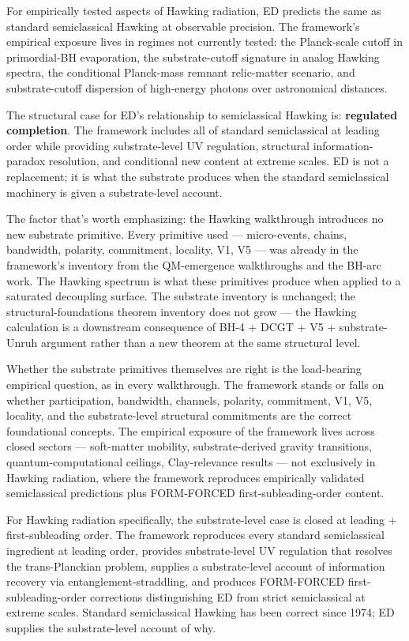 \documentclass[11pt,a4paper]{article}
\begin{document}
For empirically tested aspects of Hawking radiation, ED predicts the same as standard semiclassical Hawking at observable precision. The framework's empirical exposure lives in regimes not currently tested: the Planck-scale cutoff in primordial-BH evaporation, the substrate-cutoff signature in analog Hawking spectra, the conditional Planck-mass remnant relic-matter scenario, and substrate-cutoff dispersion of high-energy photons over astronomical distances.

The structural case for ED's relationship to semiclassical Hawking is: \textbf{regulated completion}. The framework includes all of standard semiclassical at leading order while providing substrate-level UV regulation, structural information-paradox resolution, and conditional new content at extreme scales. ED is not a replacement; it is what the substrate produces when the standard semiclassical machinery is given a substrate-level account.

The factor that's worth emphasizing: the Hawking walkthrough introduces no new substrate primitive. Every primitive used --- micro-events, chains, bandwidth, polarity, commitment, locality, V1, V5 --- was already in the framework's inventory from the QM-emergence walkthroughs and the BH-arc work. The Hawking spectrum is what these primitives produce when applied to a saturated decoupling surface. The substrate inventory is unchanged; the structural-foundations theorem inventory does not grow --- the Hawking calculation is a downstream consequence of BH-4 + DCGT + V5 + substrate-Unruh argument rather than a new theorem at the same structural level.

Whether the substrate primitives themselves are right is the load-bearing empirical question, as in every walkthrough. The framework stands or falls on whether participation, bandwidth, channels, polarity, commitment, V1, V5, locality, and the substrate-level structural commitments are the correct foundational concepts. The empirical exposure of the framework lives across closed sectors --- soft-matter mobility, substrate-derived gravity transitions, quantum-computational ceilings, Clay-relevance results --- not exclusively in Hawking radiation, where the framework reproduces empirically validated semiclassical predictions plus FORM-FORCED first-subleading-order content.

For Hawking radiation specifically, the substrate-level case is closed at leading + first-subleading order. The framework reproduces every standard semiclassical ingredient at leading order, provides substrate-level UV regulation that resolves the trans-Planckian problem, supplies a substrate-level account of information recovery via entanglement-straddling, and produces FORM-FORCED first-subleading-order corrections distinguishing ED from strict semiclassical at extreme scales. Standard semiclassical Hawking has been correct since 1974; ED supplies the substrate-level account of why.
\end{document}
